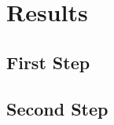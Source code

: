 \chapter{Results}\label{ch:results}

\Blindtext


\section{First Step}

\Blindtext


\section{Second Step}

\Blindtext
